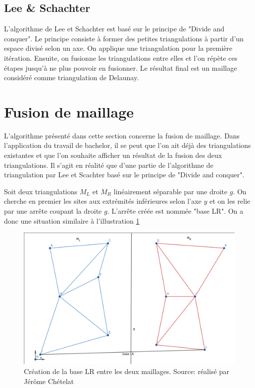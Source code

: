 \subsection{Lee \& Schachter}

L'algorithme de Lee et Schachter est basé sur le principe de "Divide and conquer".
Le principe consiste à former des petites triangulations à partir d'un espace divisé selon un axe.
On applique une triangulation pour la première itération.
Ensuite, on fusionne les triangulations entre elles et l'on répète ces étapes jusqu'à ne plus pouvoir en fusionner.
Le résultat final est un maillage considéré comme triangulation de Delaunay. 

\section{Fusion de maillage}

L'algorithme présenté dans cette section concerne la fusion de maillage.
Dans l'application du travail de bachelor, il se peut que l'on ait déjà des triangulations existantes et que l'on souhaite afficher un résultat de la fusion des deux triangulations.
Il s'agit en réalité que d'une partie de l'algorithme de triangulation par Lee et Scachter basé sur le principe de "Divide and conquer".

Soit deux triangulations $M_L$ et $M_R$ linéairement séparable par une droite $g$.
On cherche en premier les sites aux extrémités inférieures selon l'axe $y$ et on les relie par une arrête coupant la droite $g$.
L'arrête créée est nommée "base LR". On a donc une situation similaire à l'illustration \ref{fig:base_lr}

\begin{figure}[!htb]
    \centering
    \includegraphics[width=0.8\linewidth]{figures/base_lr.png}
    \caption{Création de la base LR entre les deux maillages. Source: réalisé par Jérôme Chételat}
    \label{fig:base_lr}
\end{figure}

